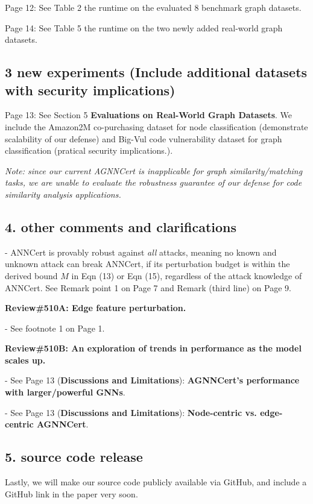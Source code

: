 \documentclass[10pt]{article}
\begin{document}
Page 12: {See Table 2 the runtime on the evaluated 8 benchmark graph datasets.} 

\noindent Page 14: See Table 5 the runtime on the two newly added real-world graph datasets. 


\subsection*{3 new experiments (Include additional datasets with security implications)} 


Page 13: See Section 5 {\bf Evaluations on Real-World Graph Datasets}. We include the Amazon2M co-purchasing dataset for node classification (demonstrate scalability of our defense) and Big-Vul code vulnerability dataset for graph classification (pratical security implications.). 

\emph{{\color{red} Note: since our current AGNNCert is inapplicable for graph similarity/matching tasks, we are unable to evaluate the robustness guarantee of our defense for code similarity analysis applications.}}



\subsection*{4. other comments and clarifications}

\vspace{+0.05in}

- ANNCert is provably robust against \emph{all} attacks, meaning no known and unknown attack can break ANNCert, if its perturbation budget is within the derived bound $M$ in Eqn (13) or Eqn (15), regardless of the attack knowledge of ANNCert. See Remark point 1 on Page 7 and Remark (third line) on Page 9.   

\vspace{+0.05in}
\noindent
{\bf Review\#510A: Edge feature perturbation.}  

- See footnote 1 on Page 1.

\vspace{+0.05in}
\noindent
{\bf Review\#510B: An exploration of trends in performance as the model scales up.} 

- See Page 13 ({\bf Discussions and Limitations}): {\bf AGNNCert’s performance with larger/powerful GNNs}.

\vspace{+0.05in}

- See Page 13 ({\bf Discussions and Limitations}): {\bf Node-centric vs. edge-centric AGNNCert}.


\subsection*{5. source code release}
Lastly, we will make our source code publicly available via GitHub, and include a GitHub link in the paper very soon. 
\end{document}
